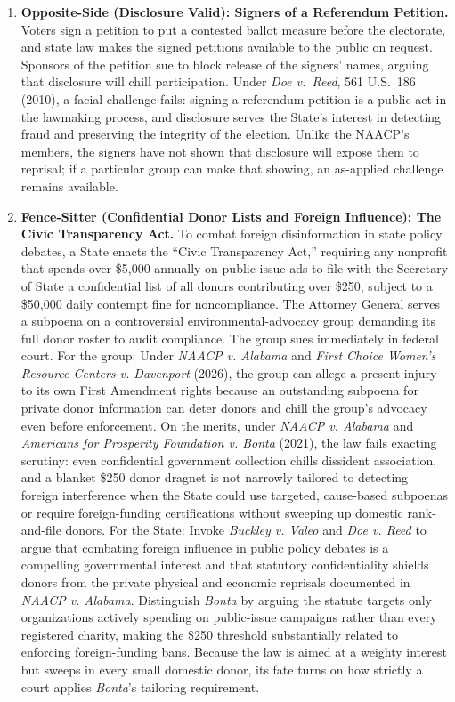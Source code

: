 \documentclass[12pt]{article}
\begin{document}
\begin{enumerate}
\item \textbf{Opposite-Side (Disclosure Valid): Signers of a Referendum Petition.} Voters sign a petition to put a contested ballot measure before the electorate, and state law makes the signed petitions available to the public on request. Sponsors of the petition sue to block release of the signers' names, arguing that disclosure will chill participation. Under \textit{Doe v.\ Reed}, 561 U.S.\ 186 (2010), a facial challenge fails: signing a referendum petition is a public act in the lawmaking process, and disclosure serves the State's interest in detecting fraud and preserving the integrity of the election. Unlike the NAACP's members, the signers have not shown that disclosure will expose them to reprisal; if a particular group can make that showing, an as-applied challenge remains available.

\item \textbf{Fence-Sitter (Confidential Donor Lists and Foreign Influence): The Civic Transparency Act.} To combat foreign disinformation in state policy debates, a State enacts the ``Civic Transparency Act,'' requiring any nonprofit that spends over \$5,000 annually on public-issue ads to file with the Secretary of State a confidential list of all donors contributing over \$250, subject to a \$50,000 daily contempt fine for noncompliance. The Attorney General serves a subpoena on a controversial environmental-advocacy group demanding its full donor roster to audit compliance. The group sues immediately in federal court. For the group: Under \textit{NAACP v. Alabama} and \textit{First Choice Women's Resource Centers v. Davenport} (2026), the group can allege a present injury to its own First Amendment rights because an outstanding subpoena for private donor information can deter donors and chill the group's advocacy even before enforcement. On the merits, under \textit{NAACP v. Alabama} and \textit{Americans for Prosperity Foundation v. Bonta} (2021), the law fails exacting scrutiny: even confidential government collection chills dissident association, and a blanket \$250 donor dragnet is not narrowly tailored to detecting foreign interference when the State could use targeted, cause-based subpoenas or require foreign-funding certifications without sweeping up domestic rank-and-file donors. For the State: Invoke \textit{Buckley v. Valeo} and \textit{Doe v. Reed} to argue that combating foreign influence in public policy debates is a compelling governmental interest and that statutory confidentiality shields donors from the private physical and economic reprisals documented in \textit{NAACP v. Alabama}. Distinguish \textit{Bonta} by arguing the statute targets only organizations actively spending on public-issue campaigns rather than every registered charity, making the \$250 threshold substantially related to enforcing foreign-funding bans. Because the law is aimed at a weighty interest but sweeps in every small domestic donor, its fate turns on how strictly a court applies \textit{Bonta}'s tailoring requirement.

\end{enumerate}
\end{document}
